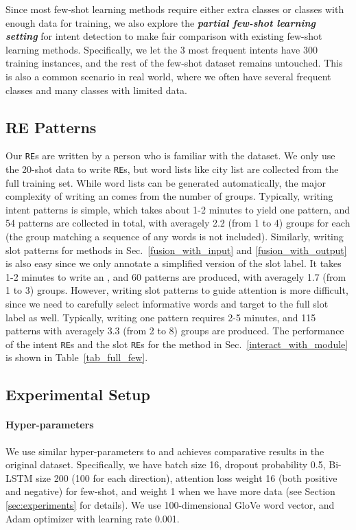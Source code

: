 Since most few-shot learning methods require either extra classes or classes with enough data for training, we also explore the \textbf{\emph{partial few-shot learning setting}} for intent detection to make fair comparison with existing few-shot learning methods. Specifically, we let the 3 most frequent intents have 300 training instances, and the rest of the few-shot dataset remains untouched.
This is also a common scenario in real world, where we often have several frequent classes and many classes with limited data.

\subsection{RE Patterns}
\label{re_in_exp}
Our \texttt{RE}s are written by a person who is familiar with the dataset.
We only use the 20-shot data to write \texttt{RE}s, but word lists like city list are collected from the full training set. 
While word lists can be generated automatically, the major complexity of writing an \RE comes from the number of \RE groups.
Typically, writing intent patterns is simple, which takes about 1-2 minutes to yield one pattern, and 54 patterns are collected in total, with averagely 2.2 (from 1 to 4) \RE groups for each \RE (the group matching a sequence of any words is not included). 
Similarly, writing slot patterns for methods in Sec.~\ref{fusion_with_input} and \ref{fusion_with_output} is also easy since we only annotate a simplified version of the slot label. It takes 1-2 minutes to write an \RE, and 60 patterns are produced, with averagely 1.7 (from 1 to 3) \RE groups.
However, writing slot patterns to guide attention is more difficult, since we need to carefully select informative words and target to the full slot label as well. Typically, writing one pattern requires 2-5 minutes, and 115 patterns with averagely 3.3 (from 2 to 8) \RE groups are produced.
The performance of the intent \texttt{RE}s and the slot \texttt{RE}s for the method in Sec.~\ref{interact_with_module} is shown in Table~\ref{tab_full_few}.


\subsection{Experimental Setup}
\paragraph{Hyper-parameters}
We use similar hyper-parameters to \cite{liu2016attention} and achieves comparative results in the original dataset. Specifically, we have batch size 16, dropout probability 0.5, Bi-LSTM size 200 (100 for each direction), attention loss weight 16 (both positive and negative) for few-shot, and weight 1 when we have more data (see Section \ref{sec:experiments} for details). We use 100-dimensional GloVe \cite{pennington2014glove} word vector, and Adam optimizer \cite{kingma2014adam} with learning rate 0.001.

